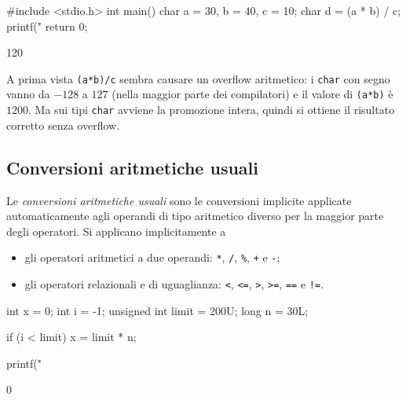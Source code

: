 \documentclass[11pt,a4paper]{article}
\begin{document}
\begin{esempio}
\begin{codice}
#include <stdio.h>
int main()
{
    char a = 30, b = 40, c = 10;
    char d = (a * b) / c;
    printf("%
    return 0;
}
\end{codice}
\begin{risultato}
120
\end{risultato}
A prima vista \lstinline|(a*b)/c| sembra causare un overflow aritmetico: i \lstinline|char| con segno vanno da $-128$ a $127$ (nella maggior parte dei compilatori) e il valore di \lstinline|(a*b)| è $1200$. Ma sui tipi \lstinline|char| avviene la promozione intera, quindi si ottiene il risultato corretto senza overflow.
\end{esempio}

\subsection{Conversioni aritmetiche usuali}

Le \emph{conversioni aritmetiche usuali} sono le conversioni implicite applicate automaticamente agli operandi di tipo aritmetico diverso per la maggior parte degli operatori. Si applicano implicitamente a
\begin{itemize}
    \item gli operatori aritmetici a due operandi: \lstinline|*|, \lstinline|/|, \lstinline|%|, \lstinline|+| e \lstinline|-|;
    \item gli operatori relazionali e di uguaglianza: \lstinline|<|, \lstinline|<=|, \lstinline|>|, \lstinline|>=|, \lstinline|==| e \lstinline|!=|.
\end{itemize}

\begin{esempio}
\begin{codice}
int x = 0;
int i = -1;
unsigned int limit = 200U;
long n = 30L;

if (i < limit)
    x = limit * n;

printf("%
\end{codice}
\begin{risultato}
0
\end{risultato}
\end{esempio}
\end{document}
